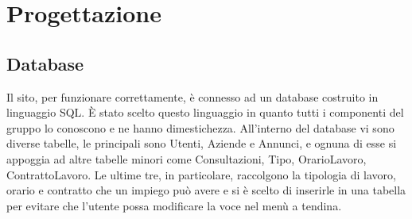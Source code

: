 \section{Progettazione}
	\subsection{Database}
Il sito, per funzionare correttamente, è connesso ad un database costruito in linguaggio SQL. È stato scelto questo linguaggio in quanto tutti i componenti del gruppo lo conoscono e ne hanno dimestichezza. 
All'interno del database vi sono diverse tabelle, le principali sono Utenti, Aziende e Annunci, e ognuna di esse si appoggia ad altre tabelle minori come Consultazioni, Tipo, OrarioLavoro, ContrattoLavoro. Le ultime tre, in particolare, raccolgono la tipologia di lavoro, orario e contratto che un impiego può avere e si è scelto di inserirle in una tabella per evitare che l'utente possa modificare la voce nel menù a tendina.   


